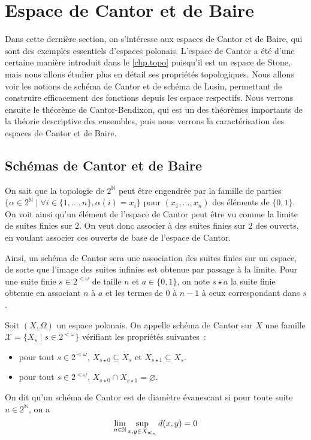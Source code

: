 \section{Espace de Cantor et de Baire}

Dans cette dernière section, on s'intéresse aux espaces de Cantor et de Baire,
qui sont des exemples essentiels d'espaces polonais. L'espace de Cantor a été
d'une certaine manière introduit dans le \cref{chp.topo} puisqu'il est un espace
de Stone, mais nous allons étudier plus en détail ses propriétés topologiques.
Nous allons voir les notions de schéma de Cantor et de schéma de Lusin,
permettant de construire efficacement des fonctions depuis les espace
respectifs. Nous verrons ensuite le théorème de Cantor-Bendixon, qui est un des
théorèmes importants de la théorie descriptive des ensembles, puis nous verrons
la caractérisation des espaces de Cantor et de Baire.

\subsection{Schémas de Cantor et de Baire}

On sait que la topologie de $2^{\mathbb N}$ peut être engendrée par la famille de
parties
$\{\alpha \in 2^{\mathbb N}\mid \forall i \in \{1,\ldots,n\}, \alpha(i) = x_i\}$
pour $(x_1,\ldots,x_n)$ des éléments de $\{0,1\}$. On voit ainsi qu'un élément
de l'espace de Cantor peut être vu comme la limite de suites finies sur $2$.
On veut donc associer à des suites finies sur $2$ des ouverts, en voulant
associer ces ouverts de base de l'espace de Cantor.

Ainsi, un schéma de Cantor sera une association des suites finies sur un espace,
de sorte que l'image des suites infinies est obtenue par passage à la limite.
Pour une suite finie $s \in 2^{<\omega}$ de taille $n$ et $a \in \{0,1\}$, on
note $s\star a$ la suite finie obtenue en associant $n$ à $a$ et les termes
de $0$ à $n-1$ à ceux correspondant dans $s$.

\begin{definition}
  Soit $(X,\Omega)$ un espace polonais. On appelle schéma de Cantor sur $X$ une
  famille $\mathcal X = \{X_s\mid s \in 2^{<\omega}\}$ vérifiant les propriétés
  suivantes~:
  \begin{itemize}
  \item pour tout $s\in 2^{<\omega}$, $X_{s\star 0} \subseteq X_s$ et
    $X_{s\star 1} \subseteq X_s$.
  \item pour tout $s\in 2^{<\omega}$,
    $X_{s\star 0}\cap X_{s\star 1} = \varnothing$.
  \end{itemize}

  On dit qu'un schéma de Cantor est de diamètre évanescant si pour toute suite
  $u\in 2^{\mathbb N}$, on a
  \[\lim_{n\in\mathbb N} \sup_{x,y\in X_{u\!\upharpoonright_{n}}}d(x,y) = 0\]
\end{definition}

